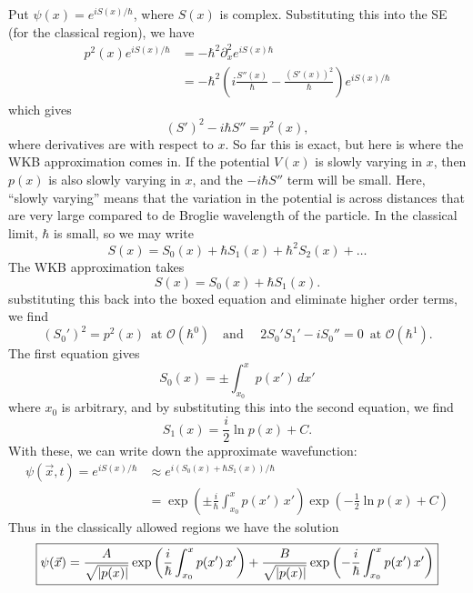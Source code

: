 \documentclass{book}
\theoremstyle{definition}
\newcommand{\p}{\partial}
\newcommand{\f}[2]{\frac{#1}{#2}}
\newcommand{\lp}{\left(}
\newcommand{\rp}{\right)}
\begin{document}
Put $\psi(x) = e^{iS(x)/\hbar}$, where $S(x)$ is complex. Substituting this into the SE (for the classical region), we have
\begin{align*}
p^2(x) e^{iS(x)/\hbar} &= -\hbar^2 \p_x^2 e^{iS(x)\hbar} \\
&= -\hbar^2 \lp i \f{S''(x)}{\hbar}  - \f{(S'(x))^2}{\hbar}\rp e^{iS(x)/\hbar}
\end{align*}
which gives
\begin{equation*}
\boxed{(S')^2 - i\hbar S'' = p^2(x)},
\end{equation*}
where derivatives are with respect to $x$. So far this is exact, but here is where the WKB approximation comes in. If the potential $V(x)$ is slowly varying in $x$, then $p(x)$ is also slowly varying in $x$, and the $-i\hbar S''$ term will be small. Here, ``slowly varying'' means that the variation in the potential is across distances that are very large compared to de Broglie wavelength of the particle. In the classical limit, $\hbar$ is small, so we may write 
\begin{equation*}
S(x) = S_0(x) + \hbar S_1 (x) + \hbar^2 S_2(x) + \dots
\end{equation*}
The WKB approximation takes
\begin{equation*}
S(x) = S_0(x) + \hbar S_1(x). 
\end{equation*}
substituting this back into the boxed equation and eliminate higher order terms, we find 
\begin{equation*}
(S_0')^2 = p^2(x) \, \text{ at } \mathcal{O}(\hbar^0) \quad \text{and } \quad
2S_0'S_1' - iS_0'' = 0\, \text{ at } \mathcal{O}(\hbar^1).
\end{equation*}
The first equation gives
\begin{equation*}
S_0(x) = \pm  \int_{x_0}^x p(x')\,dx'
\end{equation*}
where $x_0$ is arbitrary, and by substituting this into the second equation, we find 
\begin{equation*}
S_1(x) = \f{i}{2} \ln p(x) + C.
\end{equation*}
With these, we can write down the approximate wavefunction:
\begin{align*}
\psi(\vec{x},t) = e^{iS(x)/\hbar} &\approx e^{i(S_0(x) + \hbar S_1(x))/\hbar}\\
&= \exp\lp \pm \f{i}{\hbar}\int_{x_0}^x p(x')\,x' \rp \exp \lp -\f{1}{2}\ln p(x) + C \rp
\end{align*}
Thus in the classically allowed regions we have the solution
\begin{equation*}
\boxed{\psi(\vec{x}) = \f{A}{\sqrt{\abs{p(x)}}} \exp\lp \f{i}{\hbar}\int_{x_0}^x p(x')\,x' \rp  + \f{B}{\sqrt{\abs{p(x)}}} \exp\lp -\f{i}{\hbar}\int_{x_0}^x p(x')\,x' \rp    }
\end{equation*}
\end{document}
